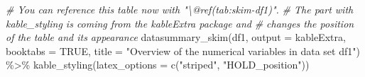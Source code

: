 \documentclass[
  11pt,
  a4paper,
  twoside]{scrbook}
\newenvironment{Shaded}{\begin{snugshade}}{\end{snugshade}}
\newcommand{\AttributeTok}[1]{\textcolor[rgb]{0.77,0.63,0.00}{#1}}
\newcommand{\CommentTok}[1]{\textcolor[rgb]{0.56,0.35,0.01}{\textit{#1}}}
\newcommand{\ConstantTok}[1]{\textcolor[rgb]{0.00,0.00,0.00}{#1}}
\newcommand{\FunctionTok}[1]{\textcolor[rgb]{0.00,0.00,0.00}{#1}}
\newcommand{\NormalTok}[1]{#1}
\newcommand{\SpecialCharTok}[1]{\textcolor[rgb]{0.00,0.00,0.00}{#1}}
\newcommand{\StringTok}[1]{\textcolor[rgb]{0.31,0.60,0.02}{#1}}
\begin{document}
\linespread{1}

\begin{Shaded}
\begin{Highlighting}[]
\CommentTok{\# You can reference this table now with "\textbackslash{}@ref(tab:skim{-}df1)".}
\CommentTok{\# The part with kable\_styling is coming from the kableExtra package and }
\CommentTok{\# changes the position of the table and its appearance}
\FunctionTok{datasummary\_skim}\NormalTok{(df1, }\AttributeTok{output =} \StringTok{\textquotesingle{}kableExtra\textquotesingle{}}\NormalTok{, }\AttributeTok{booktabs =} \ConstantTok{TRUE}\NormalTok{,}
        \AttributeTok{title =} \StringTok{"Overview of the numerical variables in data set df1"}\NormalTok{) }\SpecialCharTok{\%\textgreater{}\%}
    \FunctionTok{kable\_styling}\NormalTok{(}\AttributeTok{latex\_options =} \FunctionTok{c}\NormalTok{(}\StringTok{"striped"}\NormalTok{, }\StringTok{"HOLD\_position"}\NormalTok{))}
\end{Highlighting}
\end{Shaded}

\linespread{1}
\end{document}
